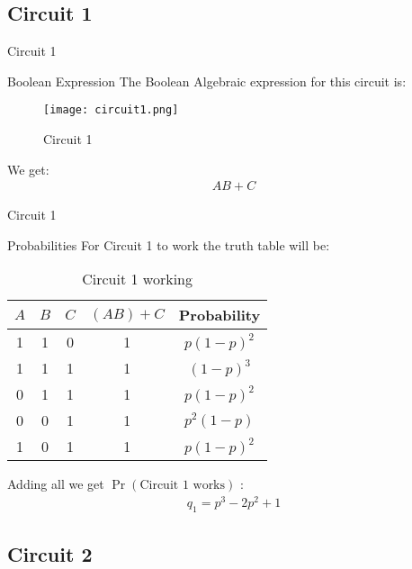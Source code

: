 \documentclass{beamer}
\providecommand{\pr}[1]{\ensuremath{\Pr\left(#1\right)}}
\begin{document}
\subsection{Circuit 1}
\begin{frame}{Circuit 1}
\begin{block}{Boolean Expression}
The Boolean Algebraic expression for this circuit is:
    \begin{figure}
        \centering
        \texttt{[image: circuit1.png]}
        \caption{Circuit 1}
        \label{cir1_label}
    \end{figure}
    We get:
    \begin{align}
        AB + C
    \end{align}
\end{block}
\end{frame}
\begin{frame}{Circuit 1}
\begin{block}{Probabilities}
    For Circuit 1 to work the truth table will be:
    \begin{table}[h]
    \centering
    \begin{tabular}{|c|c|c|c|c|}
    \hline
         $A$ & $B$ & $C$ & $(AB) + C$& Probability \\
         \hline
         1 &1  & 0 &1 &$p(1-p)^2$\\\hline
         1&1&1&1&$(1-p)^3$\\\hline
         0&1&1&1&$p(1-p)^2$\\\hline
         0&0&1&1&$p^2(1-p)$\\\hline
         1&0&1&1&$p(1-p)^2$\\
    \hline
    \end{tabular}
    \caption{Circuit 1 working}
    \label{table_1}
\end{table}
    Adding all we get $\pr{\text{Circuit 1 works}}$ :
    \begin{align}
        q_1 = p^3-2p^2+1 \label{q_1_label}
    \end{align}
\end{block}
\end{frame}
\subsection{Circuit 2}
\end{document}
